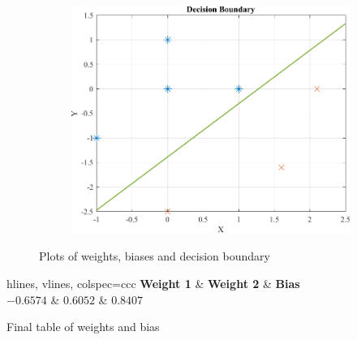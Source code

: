 \begin{figure}[htpb]
\begin{subfigure}[c]{0.3\textwidth}
	\end{subfigure}
	\hspace{1mm}
	\begin{subfigure}[l]{0.3\textwidth}
		\centering
		\includegraphics[width=\textwidth]{../Problem 10/prob10_adaline_decision_boundary.pdf}
		\caption{}
		\label{fig:prob10_decision_boundary}
	\end{subfigure}
	\caption{Plots of weights, biases and decision boundary}
	\label{fig:prob10_plot_weights_biases}
\end{figure}

\begin{table}[H]
	\centering
	\begin{tblr}{hlines, vlines, colspec={ccc}}
		\textbf{Weight 1} & \textbf{Weight 2} & \textbf{Bias} \\
		$-0.6574$ & $0.6052$ & $0.8407$ \\
	\end{tblr}
	\caption{Final table of weights and bias}
	\label{table:prob10_final_weight_bias}
\end{table}